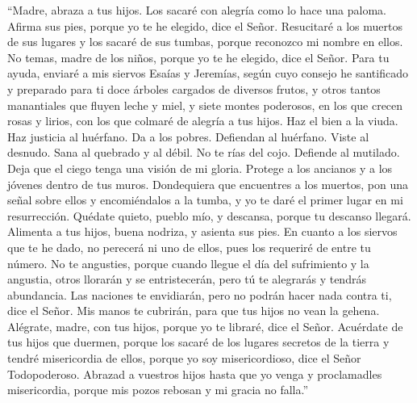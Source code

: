  ``Madre, abraza a tus hijos. Los sacaré con alegría como
lo hace una paloma. Afirma sus pies, porque yo te he elegido, dice el
Señor.  Resucitaré a los muertos de sus lugares y los
sacaré de sus tumbas, porque reconozco mi nombre en ellos.
 No temas, madre de los niños, porque yo te he elegido,
dice el Señor.  Para tu ayuda, enviaré a mis siervos
Esaías y Jeremías, según cuyo consejo he santificado y preparado para ti
doce árboles cargados de diversos frutos,  y otros tantos
manantiales que fluyen leche y miel, y siete montes poderosos, en los
que crecen rosas y lirios, con los que colmaré de alegría a tus hijos.
 Haz el bien a la viuda. Haz justicia al huérfano. Da a
los pobres. Defiendan al huérfano. Viste al desnudo. 
Sana al quebrado y al débil. No te rías del cojo. Defiende al mutilado.
Deja que el ciego tenga una visión de mi gloria.  Protege
a los ancianos y a los jóvenes dentro de tus muros. 
Dondequiera que encuentres a los muertos, pon una señal sobre ellos y
encomiéndalos a la tumba, y yo te daré el primer lugar en mi
resurrección.  Quédate quieto, pueblo mío, y descansa,
porque tu descanso llegará.  Alimenta a tus hijos, buena
nodriza, y asienta sus pies.  En cuanto a los siervos que
te he dado, no perecerá ni uno de ellos, pues los requeriré de entre tu
número.  No te angusties, porque cuando llegue el día del
sufrimiento y la angustia, otros llorarán y se entristecerán, pero tú te
alegrarás y tendrás abundancia.  Las naciones te
envidiarán, pero no podrán hacer nada contra ti, dice el Señor.
 Mis manos te cubrirán, para que tus hijos no vean la
gehena.  Alégrate, madre, con tus hijos, porque yo te
libraré, dice el Señor.  Acuérdate de tus hijos que
duermen, porque los sacaré de los lugares secretos de la tierra y tendré
misericordia de ellos, porque yo soy misericordioso, dice el Señor
Todopoderoso.  Abrazad a vuestros hijos hasta que yo
venga y proclamadles misericordia, porque mis pozos rebosan y mi gracia
no falla.''

